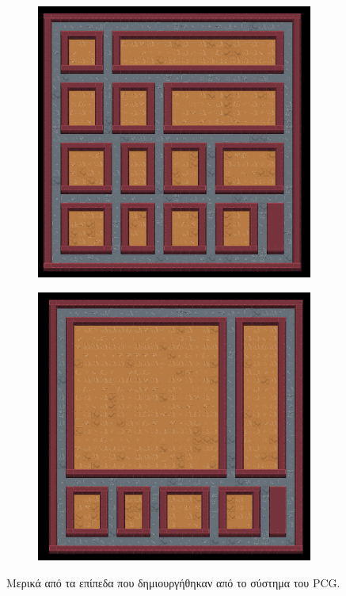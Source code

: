 \begin{figure}[H]
\begin{subfigure}{.5\textwidth}
  \includegraphics[width=.8\linewidth]{../images/pcg_images/pcg5.png}
  \label{fig:sfig1}
\end{subfigure}%
\begin{subfigure}{.5\textwidth}
  \centering
  \includegraphics[width=.8\linewidth]{../images/pcg_images/pcg6.png}
  \label{fig:sfig2}
\end{subfigure}
\caption{Μερικά από τα επίπεδα που δημιουργήθηκαν από το σύστημα του PCG.}
\label{fig:fig}
\end{figure}













